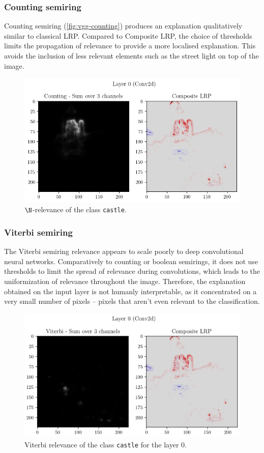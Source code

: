 \documentclass[twocolumn]{../cs-classes/cs-classes}
\newcommand*{\1}{\digitsbb{1}}
\newcommand*{\0}{\digitsbb{0}}
\begin{document}
\subsubsection{Counting semiring}
Counting semiring (\autoref{fig:vgg-counting}) produces an explanation qualitatively similar to classical LRP. Compared to Composite LRP, the choice of thresholds limits the propagation of relevance to provide a more localised explanation. This avoids the inclusion of less relevant elements such as the street light on top of the image.
\begin{figure}[H]
    \centering
    \includegraphics[width=\linewidth]{vgg-counting.png}
    \caption{$\N$-relevance of the class \texttt{castle}.}
    \label{fig:vgg-counting}
\end{figure}

\subsubsection{Viterbi semiring}
The Viterbi semiring relevance appears to scale poorly to deep convolutional neural networks. Comparatively to counting or boolean semirings, it does not use thresholds to limit the spread of relevance during convolutions, which leads to the uniformization of relevance throughout the image. Therefore, the explanation obtained on the input layer is not humanly interpretable, as it concentrated on a very small number of pixels -- pixels that aren't even relevant to the classification.

\begin{figure}[H]
    \centering
    \includegraphics[width=\linewidth]{vgg-viterbi-0.png}
    \caption{Viterbi relevance of the class \texttt{castle} for the layer 0.}
\end{figure}
\end{document}
